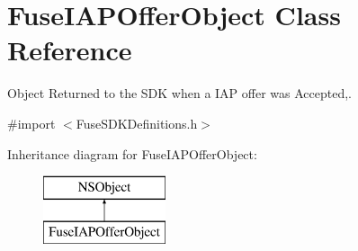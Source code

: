 \hypertarget{interface_fuse_i_a_p_offer_object}{}\section{Fuse\+I\+A\+P\+Offer\+Object Class Reference}
\label{interface_fuse_i_a_p_offer_object}


Object Returned to the S\+D\+K when a I\+A\+P offer was Accepted,.  




{\ttfamily \#import $<$Fuse\+S\+D\+K\+Definitions.\+h$>$}

Inheritance diagram for Fuse\+I\+A\+P\+Offer\+Object\+:\begin{figure}[H]
\begin{center}
\leavevmode
\includegraphics[height=2.000000cm]{interface_fuse_i_a_p_offer_object}
\end{center}
\end{figure}
